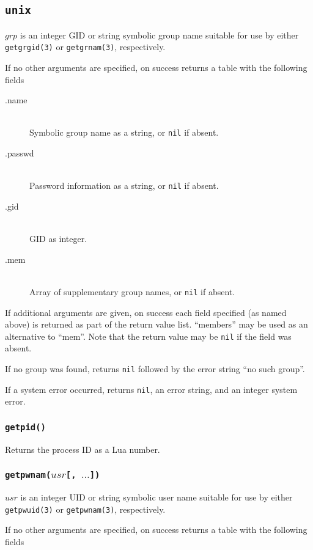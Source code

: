 \documentclass[11pt, oneside]{memoir}
\newcommand*{\nil}[0]{\texttt{nil}\xspace}
\newcommand*{\syscall}[1]{\texttt{#1}\xspace}
\newcommand*{\fn}[1]{\texttt{#1}\xspace}
\newcounter{toccols}
\newenvironment{Module}[1]{
	\subsection{\texttt{#1}}
	\addtocontents{toc}{
		\protect\begin{multicols}{\value{toccols}}
	}
}{
	\addtocontents{toc}{\protect\end{multicols}}
}
\begin{document}
\begin{Module}{unix}
$grp$ is an integer GID or string symbolic group name suitable for use by either \syscall{getgrgid(3)} or \syscall{getgrnam(3)}, respectively.

If no other arguments are specified, on success returns a table with the following fields

\begin{description}
\item[.name] \hfill \\
Symbolic group name as a string, or \nil if absent.
\item[.passwd] \hfill \\
Password information as a string, or \nil if absent.
\item[.gid] \hfill \\
GID as integer.
\item[.mem] \hfill \\
Array of supplementary group names, or \nil if absent.
\end{description}

If additional arguments are given, on success each field specified (as named above) is returned as part of the return value list. ``members'' may be used as an alternative to ``mem''. Note that the return value may be \nil if the field was absent.

If no group was found, returns \nil followed by the error string ``no such group''.

If a system error occurred, returns \nil, an error string, and an integer system error.


\subsubsection[\fn{getpid}]{\fn{getpid()}}

Returns the process ID as a Lua number.

\subsubsection[\fn{getpwnam}]{\fn{getpwnam($usr$[, $\ldots$])}}

$usr$ is an integer UID or string symbolic user name suitable for use by either \syscall{getpwuid(3)} or \syscall{getpwnam(3)}, respectively.

If no other arguments are specified, on success returns a table with the following fields


\end{Module}
\end{document}
